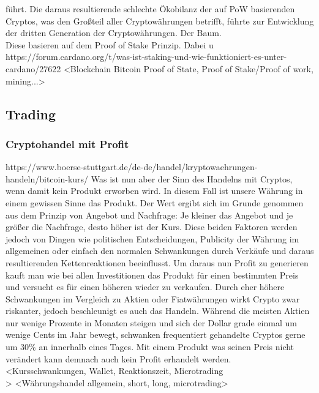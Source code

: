 \documentclass[12pt]{article}
\begin{document}
führt. Die daraus resultierende schlechte Ökobilanz der auf PoW basierenden Cryptos, was den Großteil aller Cryptowährungen betrifft, führte zur Entwicklung der dritten Generation der Cryptowährungen. Der Baum.\\
		Diese basieren auf dem Proof of Stake Prinzip. Dabei  u
		https://forum.cardano.org/t/was-ist-staking-und-wie-funktioniert-es-unter-cardano/27622
		<Blockchain Bitcoin Proof of State, Proof of Stake/Proof of work, mining...>

\subsection{Trading}
	\subsubsection{Cryptohandel mit Profit}
		https://www.boerse-stuttgart.de/de-de/handel/kryptowaehrungen-handeln/bitcoin-kurs/
		Was ist nun aber der Sinn des Handelns mit Cryptos, wenn damit kein Produkt erworben wird. In diesem Fall ist unsere Währung in einem gewissen Sinne das Produkt. Der Wert ergibt sich im Grunde genommen aus dem Prinzip von Angebot und Nachfrage: Je kleiner das Angebot und je größer die Nachfrage, desto höher ist der Kurs. Diese beiden Faktoren werden jedoch von Dingen wie politischen Entscheidungen, Publicity der Währung im allgemeinen oder einfach den normalen Schwankungen durch Verkäufe und daraus resultierenden Kettenreaktionen beeinflusst. Um daraus nun Profit zu generieren kauft man wie bei allen Investitionen das Produkt für einen bestimmten Preis und versucht es für einen höheren wieder zu verkaufen. Durch eher höhere Schwankungen im Vergleich zu Aktien oder Fiatwährungen wirkt Crypto zwar riskanter, jedoch beschleunigt es auch das Handeln. Während die meisten Aktien nur wenige Prozente in Monaten steigen und sich der Dollar grade einmal um wenige Cents im Jahr bewegt, schwanken frequentiert gehandelte Cryptos gerne um 30\% an innerhalb eines Tages. Mit einem Produkt was seinen Preis nicht verändert kann demnach auch kein Profit erhandelt werden.  
		<Kursschwankungen, Wallet, Reaktionszeit, Microtrading\\>
		<Währungshandel allgemein, short, long, microtrading>
		
\end{document}
